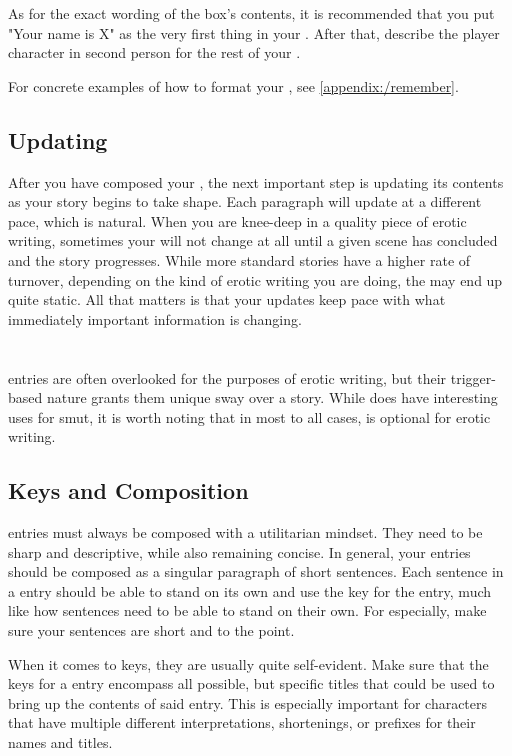 ﻿\documentclass[Coomer-main.tex]{subfiles}
\begin{document}
As for the exact wording of the \rem box's contents, it is recommended that you put "Your name is X" as the very first thing in your \rem.
After that, describe the player character in second person for the rest of your \rem.

For concrete examples of how to format your \rem, see \cref{appendix:/remember}.
\section{Updating}

After you have composed your \rem, the next important step is updating its contents as your story begins to take shape.
Each paragraph will update at a different pace, which is natural.
When you are knee-deep in a quality piece of erotic writing, sometimes your \rem will not change at all until a given scene has concluded and the story progresses.
While more standard stories have a higher rate of \rem turnover, depending on the kind of erotic writing you are doing, the \rem may end up quite static.
All that matters is that your updates keep pace with what immediately important information is changing.

\chapter{\wi}
\label{ch:wi}

\wi entries are often overlooked for the purposes of erotic writing, but their trigger-based nature grants them unique sway over a story.
While \wi does have interesting uses for smut, it is worth noting that in most to all cases, \wi is optional for erotic writing.

\section{Keys and Composition}

\wi entries must always be composed with a utilitarian mindset.
They need to be sharp and descriptive, while also remaining concise.
In general, your entries should be composed as a singular paragraph of short sentences.
Each sentence in a \wi entry should be able to stand on its own and use the key for the entry, much like how \rem sentences need to be able to stand on their own.
For \wi especially, make sure your sentences are short and to the point.

When it comes to keys, they are usually quite self-evident.
Make sure that the keys for a \wi entry encompass all possible, but specific titles that could be used to bring up the contents of said entry.
This is especially important for characters that have multiple different interpretations, shortenings, or prefixes for their names and titles.
\end{document}
